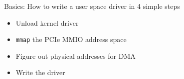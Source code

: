 \documentclass[NET,english,aspectratio=169,notitleframe]{tumbeamer}
\begin{document}
\begin{frame}{Basics: How to write a user space driver in 4 simple steps}
\begin{itemize}
\item[1.] Unload kernel driver
\item[2.] \texttt{mmap} the PCIe MMIO address space
\item[3.] Figure out physical addresses for DMA
\item[4.] Write the driver
\end{itemize}
\end{frame}




\end{document}
